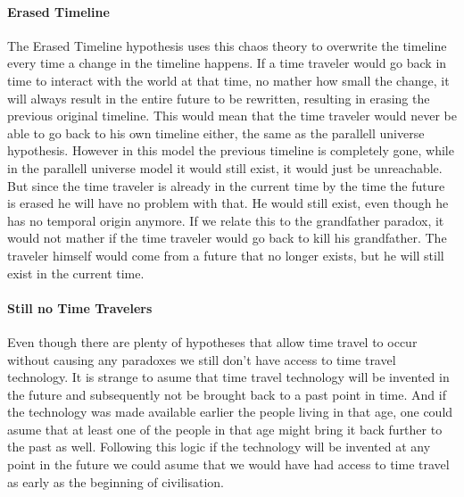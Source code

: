 \paragraph{Erased Timeline}
The Erased Timeline hypothesis uses this chaos theory to overwrite the timeline  every time a change in the timeline happens. If a time traveler would go back in time to interact with the world at that time, no mather how small the change, it will always result in the entire future to be rewritten, resulting in erasing the previous original timeline. This would mean that the time traveler would never be able to go back to his own timeline either, the same as the parallell universe hypothesis. However in this model the previous timeline is completely gone, while in the parallell universe model it would still exist, it would just be unreachable. But since the time traveler is already in the current time by the time the future is erased he will have no problem with that. He would still exist, even though he has no temporal origin anymore. If we relate this to the grandfather paradox, it would not mather if the time traveler would go back to kill his grandfather. The traveler himself would come from a future that no longer exists, but he will still exist in the current time.
\paragraph{Still no Time Travelers}
Even though there are plenty of hypotheses that allow time travel to occur without causing any paradoxes we still don't have access to time travel technology. It is strange to asume that time travel technology will be invented in the future and subsequently not be brought back to a past point in time. And if the technology was made available earlier the people living in that age, one could asume that at least one of the people in that age might bring it back further to the past as well. Following this logic if the technology will be invented at any point in the future we could asume that we would have had access to time travel as early as the beginning of civilisation.

